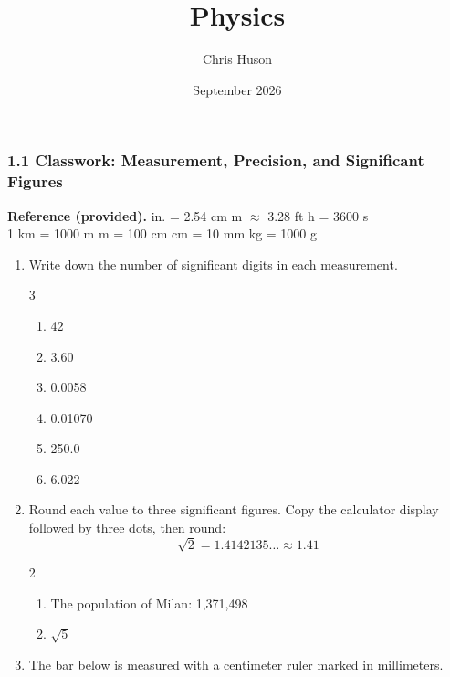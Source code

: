\documentclass[12pt, twoside]{article}
\title{Physics}
\author{Chris Huson}
\date{September 2026}
\begin{document}
\subsubsection*{1.1 Classwork: Measurement, Precision, and Significant Figures}

\textbf{Reference (provided).}  in. = 2.54 cm  m $\approx$ 3.28 ft  h = 3600 s \\
1 km = 1000 m  m = 100 cm  cm = 10 mm  kg = 1000 g

\vspace{0.15cm}

\begin{enumerate}[itemsep=0.4cm]

\item Write down the number of significant digits in each measurement.
  \begin{multicols}{3}
    \begin{enumerate}[itemsep=0.35cm]
      \item 42
      \item 3.60
      \item 0.0058
      \item 0.01070
      \item 250.0
      \item 6.022
    \end{enumerate}
  \end{multicols} \vspace{0.35cm}

\item Round each value to three significant figures. Copy the calculator display followed by three dots, then round: $$\sqrt{2} = 1.4142135\ldots \approx 1.41$$
  \begin{multicols}{2}
    \begin{enumerate}[itemsep=1cm]
      \item The population of Milan: 1,371,498
      \item $\sqrt{5}$
    \end{enumerate}
  \end{multicols} \vspace{0.8cm}

\item The bar below is measured with a centimeter ruler marked in millimeters.

\begin{center}
\end{center}


\end{enumerate}
\end{document}
